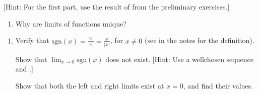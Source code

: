 \documentclass[letterpaper,10pt,english]{jupyterBook}
\begin{document}
{[}Hint: For the first part, use the result of {\hyperref[\detokenize{Problems:p4}]{}} from the preliminary exercises.{]}

\label{\detokenize{Problems:id6}}\begin{enumerate}
%
\setcounter{enumi}{5}
\item {} 
\sphinxAtStartPar
Why are limits of functions unique?

\end{enumerate}
\label{\detokenize{Problems:id7}}\begin{enumerate}
%
\setcounter{enumi}{6}
\item {} 
\sphinxAtStartPar
Verify that \(\text{sgn}(x) = \displaystyle\frac{|x|}{x} = \displaystyle\frac{x}{|x|}\), for \(x \neq 0\) (see   in the notes for the definition).

Show that \(\displaystyle\lim_{x \rightarrow 0}\text{sgn}(x)\) does not exist. {[}Hint: Use a well\sphinxhyphen{}chosen sequence and .{]}

Show that both the left and right limits exist at \(x=0\), and find their values.

\end{enumerate}
\end{document}
